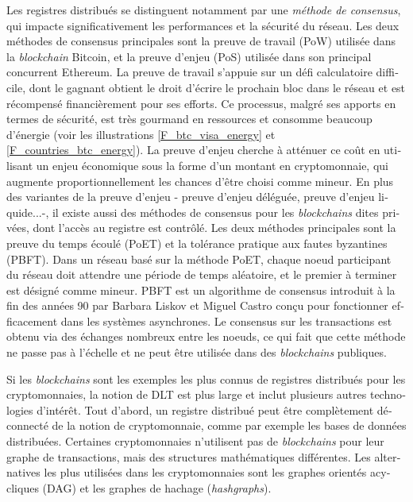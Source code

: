 \begin{otherlanguage}{french}
Les registres distribués se distinguent notamment par une \emph{méthode de consensus}, qui impacte significativement les performances et la sécurité du réseau. Les deux méthodes de consensus principales sont la preuve de travail (PoW) utilisée dans la \emph{blockchain} Bitcoin, et la preuve d'enjeu (PoS) utilisée dans son principal concurrent Ethereum. La preuve de travail s'appuie sur un défi calculatoire difficile, dont le gagnant obtient le droit d'écrire le prochain bloc dans le réseau et est récompensé financièrement pour ses efforts. Ce processus, malgré ses apports en termes de sécurité, est très gourmand en ressources et consomme beaucoup d'énergie (voir les illustrations \ref{F_btc_visa_energy} et \ref{F_countries_btc_energy}). La preuve d'enjeu cherche à atténuer ce coût en utilisant un enjeu économique sous la forme d'un montant en cryptomonnaie, qui augmente proportionnellement les chances d'être choisi comme mineur. En plus des variantes de la preuve d'enjeu - preuve d'enjeu déléguée, preuve d'enjeu liquide...-, il existe aussi des méthodes de consensus pour les \emph{blockchains} dites privées, dont l'accès au registre est contrôlé. Les deux méthodes principales sont la preuve du temps écoulé (PoET) et la tolérance pratique aux fautes byzantines (PBFT). Dans un réseau basé sur la méthode PoET, chaque noeud participant du réseau doit attendre une période de temps aléatoire, et le premier à terminer est désigné comme mineur. PBFT est un algorithme de consensus introduit à la fin des années 90 par Barbara Liskov et Miguel Castro \cite{Castro1999} conçu pour fonctionner efficacement dans les systèmes asynchrones. Le consensus sur les transactions est obtenu via des échanges nombreux entre les noeuds, ce qui fait que cette méthode ne passe pas à l'échelle et ne peut être utilisée dans des \emph{blockchains} publiques.

Si les \emph{blockchains} sont les exemples les plus connus de registres distribués pour les cryptomonnaies, la notion de DLT est plus large et inclut plusieurs autres technologies d'intérêt.
Tout d'abord, un registre distribué peut être complètement déconnecté de la notion de cryptomonnaie, comme par exemple les bases de données distribuées. Certaines cryptomonnaies n'utilisent pas de \emph{blockchains} pour leur graphe de transactions, mais des structures mathématiques différentes. Les alternatives les plus utilisées dans les cryptomonnaies sont les graphes orientés acycliques (DAG) et les graphes de hachage (\emph{hashgraphs}).


\end{otherlanguage}
